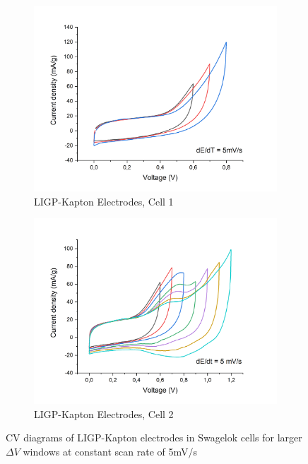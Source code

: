 \begin{figure}[H]
\begin{subfigure}{0.49\textwidth}
\includegraphics[width=1\textwidth]{Figures/Results/Electrochemistry/LIGP-PI-NaNO3-Swagelok/Cell1/CV-high-V-cell1.jpg} 
\captionsetup{width=0.9\linewidth}
\caption{LIGP-Kapton Electrodes, Cell 1}
\label{fig:LIG-PI-cell1-CV-12}
\end{subfigure}
\begin{subfigure}{0.49\textwidth}
\includegraphics[width=1\textwidth]{Figures/Results/Electrochemistry/LIGP-PI-NaNO3-Swagelok/Cell2/CV-high-volt-cell2.jpg}
\captionsetup{width=0.9\linewidth}
\caption{LIGP-Kapton Electrodes, Cell 2}
\label{fig:LIG-PI-cell2-CV-12}
\end{subfigure}
\medskip
\caption{CV diagrams of LIGP-Kapton electrodes in Swagelok cells for larger $\Delta V$ windows at constant scan rate of 5\:mV/s}
\label{fig:LIG-PI-CV-12}
\end{figure}

